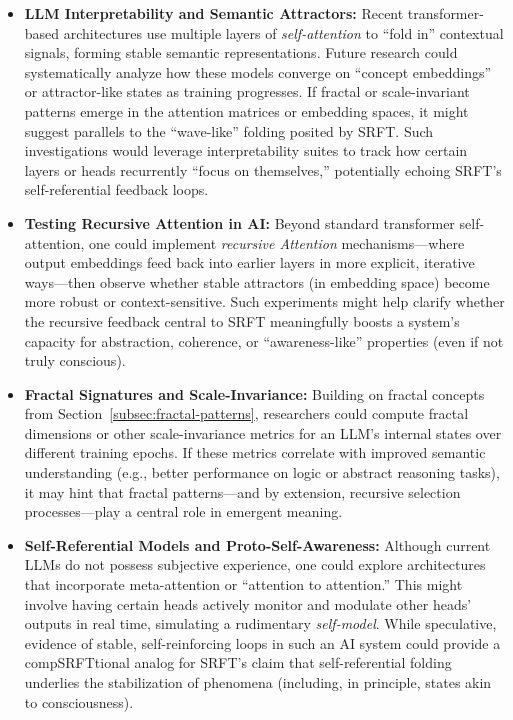\documentclass[12pt,a4paper]{article}
\begin{document}
\begin{itemize}
    \item \textbf{LLM Interpretability and Semantic Attractors:}
    Recent transformer-based architectures \cite{Vaswani2017, Devlin2019, Brown2020} use multiple layers of \emph{self-attention} to “fold in” contextual signals, forming stable semantic representations. Future research could systematically analyze how these models converge on “concept embeddings” or attractor-like states as training progresses. If fractal or scale-invariant patterns emerge in the attention matrices or embedding spaces, it might suggest parallels to the “wave-like” folding posited by SRFT. Such investigations would leverage interpretability suites to track how certain layers or heads recurrently “focus on themselves,” potentially echoing SRFT’s self-referential feedback loops.

    \item \textbf{Testing Recursive Attention in AI:}
    Beyond standard transformer self-attention, one could implement \emph{recursive Attention} mechanisms—where output embeddings feed back into earlier layers in more explicit, iterative ways—then observe whether stable attractors (in embedding space) become more robust or context-sensitive. Such experiments might help clarify whether the recursive feedback central to SRFT meaningfully boosts a system’s capacity for abstraction, coherence, or “awareness-like” properties (even if not truly conscious).

    \item \textbf{Fractal Signatures and Scale-Invariance:}
    Building on fractal concepts from Section~\ref{subsec:fractal-patterns}, researchers could compute fractal dimensions or other scale-invariance metrics for an LLM’s internal states over different training epochs. If these metrics correlate with improved semantic understanding (e.g., better performance on logic or abstract reasoning tasks), it may hint that fractal patterns—and by extension, recursive selection processes—play a central role in emergent meaning.

    \item \textbf{Self-Referential Models and Proto-Self-Awareness:}
    Although current LLMs do not possess subjective experience, one could explore architectures that incorporate meta-attention or “attention to attention.” This might involve having certain heads actively monitor and modulate other heads’ outputs in real time, simulating a rudimentary \emph{self-model}. While speculative, evidence of stable, self-reinforcing loops in such an AI system could provide a compSRFTtional analog for SRFT’s claim that self-referential folding underlies the stabilization of phenomena (including, in principle, states akin to consciousness).


\end{itemize}
\end{document}
